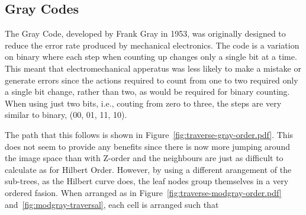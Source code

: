 \subsection{Gray Codes}
\label{sub:gray_codes}

The Gray Code\cite{gray1953pulse}, developed by Frank Gray in 1953, was
originally designed to reduce the error rate produced by mechanical
electronics. The code is a variation on binary where each step when counting
up changes only a single bit at a time. This meant that electromechanical
apperatus was less likely to make a mistake or generate errors since the
actions required to count from one to two required only a single bit change,
rather than two, as would be required for binary counting. When using just two
bits, i.e., couting from zero to three, the steps are very similar to binary,
(00, 01, 11, 10).

The path that this follows is shown in
Figure~\ref{fig:traverse-gray-order.pdf}. This does not seem to provide any
benefits since there is now more jumping around the image space than with
Z-order and the neighbours are just as difficult to calculate as for Hilbert
Order. However, by using a different arangement of the sub-trees, as the
Hilbert curve does, the leaf nodes group themselves in a very ordered
fasion. When arranged as in Figure~\ref{fig:traverse-modgray-order.pdf}
and~\ref{fig:modgray-traversal}, each cell is arranged such that


